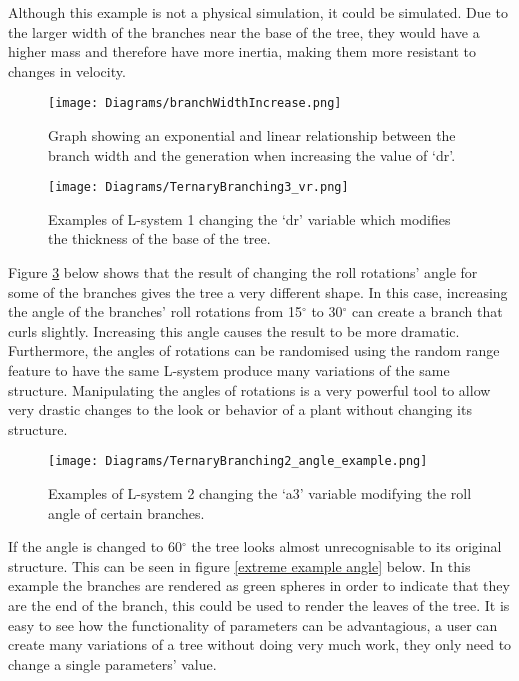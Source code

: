 Although this example is not a physical simulation, it could be simulated. Due to the larger width of the branches near the base of the tree, they would have a higher mass and therefore have more inertia, making them more resistant to changes in velocity.

\begin{figure}[htbp]
	{\centering
		\vspace{7px}
		\texttt{[image: Diagrams/branchWidthIncrease.png]}
		\caption{Graph showing an exponential and linear relationship between the branch width and the generation when increasing the value of `dr'.} \label{graph thickness}
	}
\end{figure}
\FloatBarrier

\begin{figure}[htbp]
	{\centering
		\vspace{7px}
		\texttt{[image: Diagrams/TernaryBranching3\_vr.png]} 
		\caption{Examples of L-system 1 changing the `dr' variable which modifies the thickness of the base of the tree.} \label{example thickness}
	}
\end{figure}
\FloatBarrier

\noindent
Figure \ref{example angle} below shows that the result of changing the roll rotations' angle for some of the branches gives the tree a very different shape. In this case, increasing the angle of the branches' roll rotations from 15$^\circ$ to 30$^\circ$ can create a branch that curls slightly. Increasing this angle causes the result to be more dramatic. Furthermore, the angles of rotations can be randomised using the random range feature to have the same L-system produce many variations of the same structure. Manipulating the angles of rotations is a very powerful tool to allow very drastic changes to the look or behavior of a plant without changing its structure. 

\begin{figure}[htbp]
	{\centering
		\vspace{7px}
		\texttt{[image: Diagrams/TernaryBranching2\_angle\_example.png]}
		\caption{Examples of L-system 2 changing the `a3' variable modifying the roll angle of certain branches.} \label{example angle}
	}
\end{figure}
\FloatBarrier

\noindent
If the angle is changed to 60$^\circ$ the tree looks almost unrecognisable to its original structure. This can be seen in figure \ref{extreme example angle} below. In this example the branches are rendered as green spheres in order to indicate that they are the end of the branch, this could be used to render the leaves of the tree. It is easy to see how the functionality of parameters can be advantagious, a user can create many variations of a tree without doing very much work, they only need to change a single parameters' value. 

